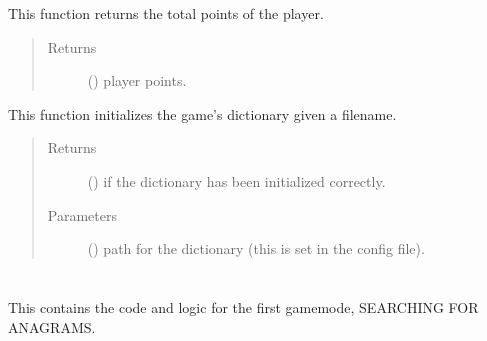 \documentclass[letterpaper,10pt,english,openany,oneside]{sphinxmanual}
\begin{document}

\begin{fulllineitems}
\label{\detokenize{index:engine.combine_points}}
This function returns the total points of the player.
\begin{quote}\begin{description}
\item[{Returns}] \leavevmode
() player points.

\end{description}\end{quote}

\end{fulllineitems}


\begin{fulllineitems}
\label{\detokenize{index:engine.init_dictionary}}
This function initializes the game’s dictionary given a filename.
\begin{quote}\begin{description}
\item[{Returns}] \leavevmode
() if the dictionary has been initialized correctly.

\item[{Parameters}] \leavevmode
{} () \textendash{} path for the dictionary (this is set in the config file).

\end{description}\end{quote}

\end{fulllineitems}



\section{}
\label{\detokenize{index:module-anagram}}\label{\detokenize{index:anagram-py}}
This contains the code and logic for the
first gamemode, SEARCHING FOR ANAGRAMS.
\end{document}

